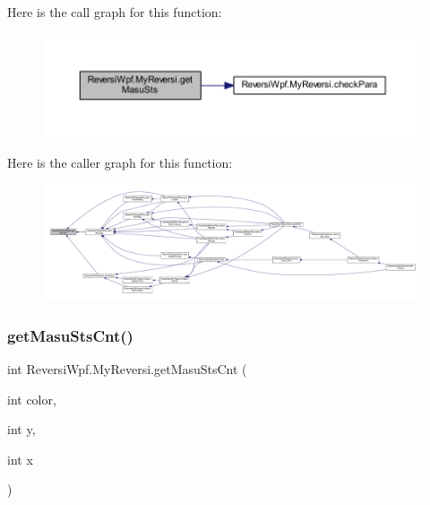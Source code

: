 Here is the call graph for this function\+:
\nopagebreak
\begin{figure}[H]
\begin{center}
\leavevmode
\includegraphics[width=350pt]{class_reversi_wpf_1_1_my_reversi_a34b0c0b96b147a8d2f1dc6863cac25d8_cgraph}
\end{center}
\end{figure}
Here is the caller graph for this function\+:
\nopagebreak
\begin{figure}[H]
\begin{center}
\leavevmode
\includegraphics[width=350pt]{class_reversi_wpf_1_1_my_reversi_a34b0c0b96b147a8d2f1dc6863cac25d8_icgraph}
\end{center}
\end{figure}
\mbox{\label{class_reversi_wpf_1_1_my_reversi_ac2723c418d4b51ec0e4598cbd44634f0}} 
\subsubsection{\texorpdfstring{get\+Masu\+Sts\+Cnt()}{getMasuStsCnt()}}
{\footnotesize\ttfamily int Reversi\+Wpf.\+My\+Reversi.\+get\+Masu\+Sts\+Cnt (\begin{DoxyParamCaption}\item[{int}]{color,  }\item[{int}]{y,  }\item[{int}]{x }\end{DoxyParamCaption})}




